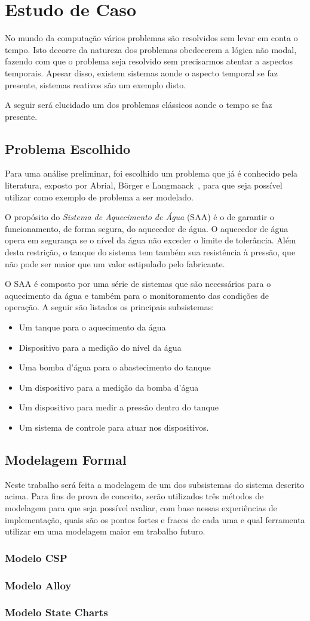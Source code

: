\section{Estudo de Caso}
No mundo da computação vários problemas são resolvidos sem levar em conta o tempo.
Isto decorre da natureza dos problemas obedecerem a lógica não modal, fazendo com que o
problema seja resolvido sem precisarmos atentar a aspectos temporais. Apesar disso,
existem sistemas aonde o aspecto temporal se faz presente, sistemas reativos são um exemplo disto.

A seguir será elucidado um dos problemas clássicos aonde o tempo se faz presente.
\subsection{Problema Escolhido}
Para uma análise preliminar, foi escolhido um problema que já é conhecido pela literatura, exposto
por Abrial, B\"{o}rger e Langmaack~\cite{opac-b1092561}, para que seja possível utilizar como exemplo
de problema a ser modelado.

O propósito do \textit{Sistema de Aquecimento de Água} (SAA) é o de garantir o funcionamento,
de forma segura, do aquecedor de água. O aquecedor de água opera em segurança se o nível da água
não exceder o limite de tolerância. Além desta restrição, o tanque do sistema tem também
sua resistência à pressão, que não pode ser maior que um valor estipulado pelo fabricante.

O SAA é composto por uma série de sistemas que são necessários para o aquecimento da água e também
para o monitoramento das condições de operação. A seguir são listados os principais subsistemas:
\begin{itemize}
\item Um tanque para o aquecimento da água
\item Dispositivo para a medição do nível da água
\item Uma bomba d'água para o abastecimento do tanque
\item Um dispositivo para a medição da bomba d'água
\item Um dispositivo para medir a pressão dentro do tanque
\item Um sistema de controle para atuar nos dispositivos.
\end{itemize}

\subsection{Modelagem Formal}
Neste trabalho será feita a modelagem de um dos subsistemas do sistema descrito acima.
Para fins de prova de conceito, serão utilizados três métodos de modelagem para que seja possível avaliar,
com base nessas experiências de implementação, quais são os pontos fortes e fracos de cada uma e qual ferramenta
utilizar em uma modelagem maior em trabalho futuro.
\subsubsection{Modelo CSP}
\subsubsection{Modelo Alloy}
\subsubsection{Modelo State Charts}
